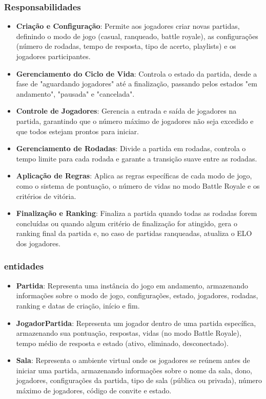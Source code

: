 \subsubsection{Responsabilidades}
    \begin{itemize}
        \item \textbf{Criação e Configuração}: Permite aos jogadores criar novas partidas, definindo o modo de jogo (casual, ranqueado, battle royale), as configurações (número de rodadas, tempo de resposta, tipo de acerto, playlists) e os jogadores participantes.
        \item \textbf{Gerenciamento do Ciclo de Vida}: Controla o estado da partida, desde a fase de "aguardando jogadores" até a finalização, passando pelos estados "em andamento", "pausada" e "cancelada".
        \item \textbf{Controle de Jogadores}: Gerencia a entrada e saída de jogadores na partida, garantindo que o número máximo de jogadores não seja excedido e que todos estejam prontos para iniciar.
        \item \textbf{Gerenciamento de Rodadas}: Divide a partida em rodadas, controla o tempo limite para cada rodada e garante a transição suave entre as rodadas.
        \item \textbf{Aplicação de Regras}: Aplica as regras específicas de cada modo de jogo, como o sistema de pontuação, o número de vidas no modo Battle Royale e os critérios de vitória.
        \item \textbf{Finalização e Ranking}: Finaliza a partida quando todas as rodadas forem concluídas ou quando algum critério de finalização for atingido, gera o ranking final da partida e, no caso de partidas ranqueadas, atualiza o ELO dos jogadores.  
    \end{itemize}

\subsubsection{entidades}
    \begin{itemize}
        \item \textbf{Partida}: Representa uma instância do jogo em andamento, armazenando informações sobre o modo de jogo, configurações, estado, jogadores, rodadas, ranking e datas de criação, início e fim.
        \item \textbf{JogadorPartida}:  Representa um jogador dentro de uma partida específica, armazenando sua pontuação, respostas, vidas (no modo Battle Royale), tempo médio de resposta e estado (ativo, eliminado, desconectado).
        \item \textbf{Sala}: Representa o ambiente virtual onde os jogadores se reúnem antes de iniciar uma partida, armazenando informações sobre o nome da sala, dono, jogadores, configurações da partida, tipo de sala (pública ou privada), número máximo de jogadores, código de convite e estado.
    \end{itemize}

